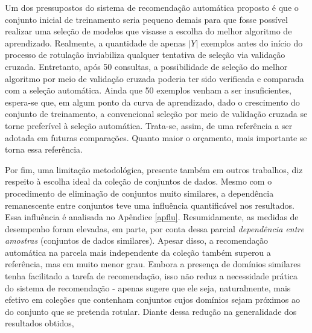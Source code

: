 Um dos pressupostos do sistema de recomendação automática proposto é que o conjunto inicial de treinamento seria pequeno demais para que fosse possível realizar uma seleção de modelos que visasse a escolha do melhor algoritmo de aprendizado.
Realmente, a quantidade de apenas $|Y|$ exemplos antes do início do processo de rotulação inviabiliza qualquer tentativa de seleção via validação cruzada.
Entretanto, após 50 consultas, a possibilidade de seleção do melhor algoritmo por meio de validação cruzada poderia ter sido verificada e comparada com a seleção automática.
Ainda que 50 exemplos venham a ser insuficientes, espera-se que, em algum ponto da curva de aprendizado, dado o crescimento do conjunto de treinamento, a convencional seleção por meio de validação cruzada se torne preferível à seleção automática.
Trata-se, assim, de uma referência a ser adotada em futuras comparações. 
Quanto maior o orçamento, mais importante se torna essa referência.

Por fim,
uma limitação metodológica, presente também em outros trabalhos, diz respeito à escolha ideal da coleção de conjuntos de dados.
Mesmo com o procedimento de eliminação de conjuntos muito similares, a dependência remanescente entre conjuntos teve uma influência quantificável nos resultados.
Essa influência é analisada no Apêndice \ref{apflu}.
Resumidamente, as medidas de desempenho foram elevadas, em parte, por conta dessa parcial \textit{dependência entre amostras} (conjuntos de dados similares).
Apesar disso, a recomendação automática na parcela mais independente da coleção também superou a referência, mas em muito menor grau.
Embora a presença de domínios similares tenha facilitado a tarefa de recomendação, isso não reduz a necessidade prática do sistema de recomendação - apenas sugere que ele seja, naturalmente, mais efetivo em coleções que contenham conjuntos cujos domínios sejam próximos ao do conjunto que se pretenda rotular.
Diante dessa redução na generalidade dos resultados obtidos,  

